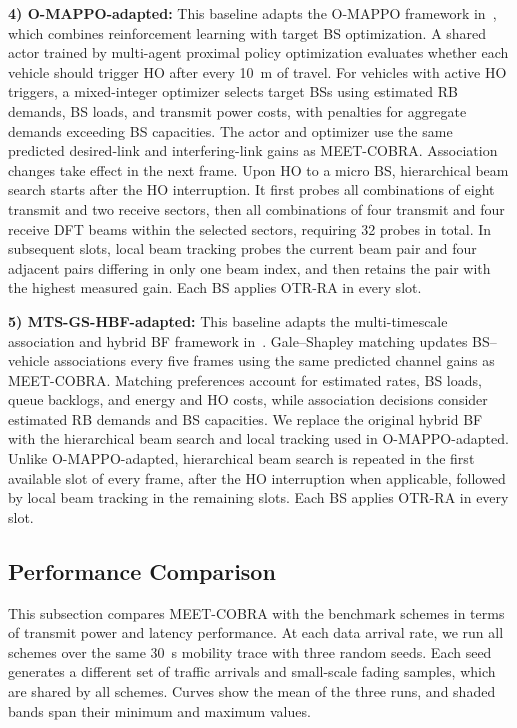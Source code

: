 \documentclass[10pt,journal,letterpaper]{IEEEtran}
\newcommand{\rev}[1]{\textcolor{revisioncolor}{{}#1}}
\theoremstyle{remark}
\begin{document}
\rev{\textbf{4) O-MAPPO-adapted:} This baseline adapts the O-MAPPO framework in~\cite{wang2024joint}, which combines reinforcement learning with target BS optimization. A shared actor trained by multi-agent proximal policy optimization evaluates whether each vehicle should trigger HO after every 10~m of travel. For vehicles with active HO triggers, a mixed-integer optimizer selects target BSs using estimated RB demands, BS loads, and transmit power costs, with penalties for aggregate demands exceeding BS capacities. The actor and optimizer use the same predicted desired-link and interfering-link gains as MEET-COBRA. Association changes take effect in the next frame. Upon HO to a micro BS, hierarchical beam search starts after the HO interruption. It first probes all combinations of eight transmit and two receive sectors, then all combinations of four transmit and four receive DFT beams within the selected sectors, requiring 32 probes in total. In subsequent slots, local beam tracking probes the current beam pair and four adjacent pairs differing in only one beam index, and then \rev{retains} the pair with the highest measured gain. Each BS applies OTR-RA in every slot.}

\rev{\textbf{5) MTS-GS-HBF-adapted:} This baseline adapts the multi-timescale association and hybrid BF framework in~\cite{heydarian2025multitimescale}. Gale--Shapley matching updates BS--vehicle associations every five frames using the same predicted channel gains as MEET-COBRA. Matching preferences account for estimated rates, BS loads, queue backlogs, and energy and HO costs, while association decisions consider estimated RB demands and BS capacities. We replace the original hybrid BF with the hierarchical beam search and local tracking used in O-MAPPO-adapted. Unlike O-MAPPO-adapted, hierarchical beam search is repeated in the first available slot of every frame, after the HO interruption when applicable, followed by local beam tracking in the remaining slots. Each BS applies OTR-RA in every slot.}

\subsection{Performance Comparison}

\rev{This subsection compares MEET-COBRA with the benchmark schemes in terms of transmit power and latency performance. At each data arrival rate, we run all schemes over the same $30$~s mobility trace with three random seeds. Each seed generates a different set of traffic arrivals and small-scale fading samples, which are shared by all schemes. Curves show the mean of the three runs, and shaded bands span their minimum and maximum values.}
\end{document}
